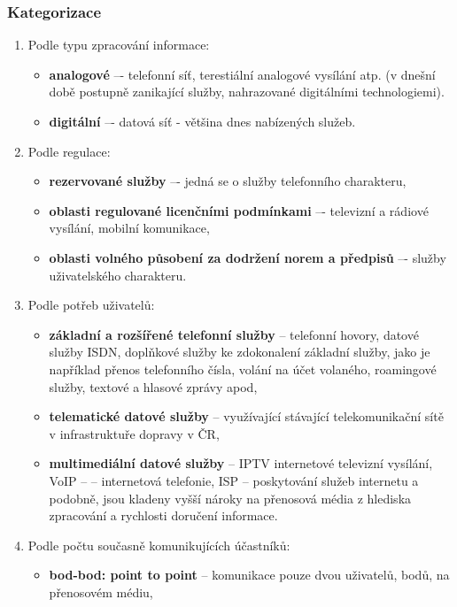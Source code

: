 \subsubsection{Kategorizace}
\begin{enumerate}
    \item Podle typu zpracování informace:
        \begin{itemize}
            \item \textbf{analogové} –- telefonní síť, terestiální analogové vysílání atp. (v dnešní době postupně zanikající služby, nahrazované digitálními technologiemi).
            \item \textbf{digitální} –- datová síť - většina dnes nabízených služeb.
        \end{itemize}
    \item Podle regulace:
        \begin{itemize}
            \item \textbf{rezervované služby} –- jedná se o služby telefonního charakteru,
            \item \textbf{oblasti regulované licenčními podmínkami} –- televizní a rádiové vysílání, mobilní komunikace,
            \item \textbf{oblasti volného působení za dodržení norem a předpisů} –- služby uživatelského charakteru. 
        \end{itemize}
    \item Podle potřeb uživatelů:
    \begin{itemize}
        \item \textbf{základní a rozšířené telefonní služby} – telefonní hovory, datové služby ISDN, doplňkové služby ke zdokonalení základní služby, jako je například přenos telefonního čísla, volání na účet volaného, roamingové služby, textové a hlasové zprávy apod,
        \item \textbf{telematické datové služby} – využívající stávající telekomunikační sítě v infrastruktuře dopravy v ČR,
        \item \textbf{multimediální datové služby} – IPTV internetové televizní vysílání, VoIP – – internetová telefonie, ISP – poskytování služeb internetu a podobně, jsou kladeny vyšší nároky na přenosová média z hlediska zpracování a rychlosti doručení informace.
    \end{itemize}
    \item Podle počtu současně komunikujících účastníků:
    \begin{itemize}
        \item \textbf{bod-bod: point to point} – komunikace pouze dvou uživatelů, bodů, na přenosovém médiu,

\end{itemize}
\end{enumerate}

